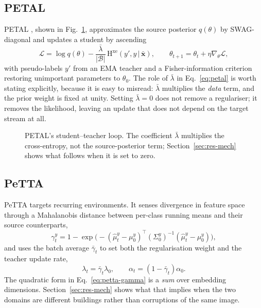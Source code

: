 \documentclass[a4paper,fleqn]{cas-dc}
\begin{document}
\subsection{PETAL}

PETAL \cite{petal}, shown in Fig.~\ref{fig:petal}, approximates the source posterior $q(\theta)$ by SWAG-diagonal and
updates a student by ascending
\begin{equation}
\mathcal{L}=\log q(\theta)-\frac{\bar\lambda}{|\mathcal{B}|}\,
\mathrm{H}^{\mathrm{xe}}(y',y\,|\,\bar{\mathbf{x}}),
\qquad \theta_{t+1}=\theta_t+\eta\nabla_\theta\mathcal{L},
\label{eq:petal}
\end{equation}
with pseudo-labels $y'$ from an EMA teacher and a Fisher-information criterion restoring
unimportant parameters to $\theta_0$. The role of $\bar\lambda$ in Eq.~\ref{eq:petal} is
worth stating explicitly, because it is easy to misread: $\bar\lambda$ multiplies the
\emph{data} term, and the prior weight is fixed at unity. Setting $\bar\lambda=0$ does not
remove a regulariser; it removes the likelihood, leaving an update that does not depend on
the target stream at all.


\begin{figure}[t]
\centering
\resizebox{0.80\textwidth}{!}{\figPETAL}
\caption{PETAL's student--teacher loop. The coefficient $\bar\lambda$ multiplies the
cross-entropy, not the source-posterior term; Section~\ref{sec:res-mech} shows what
follows when it is set to zero.}
\label{fig:petal}
\end{figure}

\subsection{PeTTA}

PeTTA \cite{petta} targets recurring environments. It senses divergence in feature space
through a Mahalanobis distance between per-class running means and their source
counterparts,
\begin{equation}
\gamma^y_t=1-\exp\!\big(-(\hat\mu^y_t-\mu^y_0)^\top(\Sigma^y_0)^{-1}(\hat\mu^y_t-\mu^y_0)\big),
\label{eq:petta-gamma}
\end{equation}
and uses the batch average $\bar\gamma_t$ to set both the regularisation weight and the
teacher update rate,
\begin{equation}
\lambda_t=\bar\gamma_t\lambda_0,\qquad \alpha_t=(1-\bar\gamma_t)\alpha_0 .
\label{eq:petta-alpha}
\end{equation}
The quadratic form in Eq.~\ref{eq:petta-gamma} is a \emph{sum} over embedding dimensions.
Section~\ref{sec:res-mech} shows what that implies when the two domains are different
buildings rather than corruptions of the same image.
\end{document}
